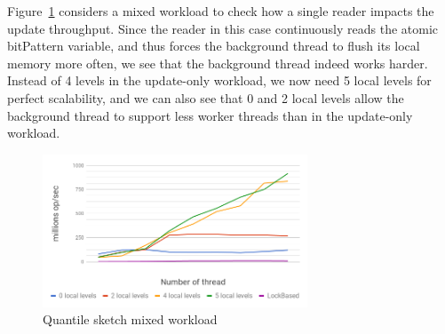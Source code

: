 Figure~\ref{fig:ConccurentQuantilesReader} considers a
mixed workload to check how a single reader impacts the update
throughput.
Since the reader in this case continuously reads the atomic
bitPattern variable, and thus forces the background thread to
flush its local memory more often, we see that the background
thread indeed works harder.
Instead of 4 levels in the update-only workload, we now need 5
local levels for perfect scalability, and we can also see that
0 and 2 local levels allow the background thread to support less
worker threads than in the update-only workload.


\begin{figure}[h]
  \centering
  \includegraphics*[width=3.1in]{images/QuantilesMixed}
  \caption{Quantile sketch mixed workload}
   \label{fig:ConccurentQuantilesReader}
\end{figure}
